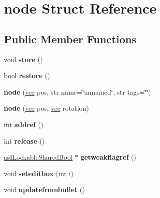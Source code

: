 \hypertarget{structnode}{}\section{node Struct Reference}
\label{structnode}
\subsection*{Public Member Functions}
\begin{DoxyCompactItemize}
\item 
\mbox{\label{structnode_a652e8a3ba9849f68590c6c6ad48727e0}} 
void {\bfseries store} ()
\item 
\mbox{\label{structnode_a4b10bbc34ccf1f2359f9c6bee8688741}} 
bool {\bfseries restore} ()
\item 
\mbox{\label{structnode_ad8786be29caf7d598abd5f0b56306a0d}} 
{\bfseries node} (\hyperlink{structvec}{vec} pos, str name=\char`\"{}unnamed\char`\"{}, str tags=\char`\"{}\char`\"{})
\item 
\mbox{\label{structnode_abfcfb23bb3a6a0e95dff9f06ea8b2eed}} 
{\bfseries node} (\hyperlink{structvec}{vec} pos, \hyperlink{structvec}{vec} rotation)
\item 
\mbox{\label{structnode_a9521b5120834b5f9d2a2471e299691fc}} 
int {\bfseries addref} ()
\item 
\mbox{\label{structnode_afa08d56e84b68071c717d01f93c3c764}} 
int {\bfseries release} ()
\item 
\mbox{\label{structnode_a0987a5e24163efa04953457c1b3ce3d3}} 
\hyperlink{classas_i_lockable_shared_bool}{as\+I\+Lockable\+Shared\+Bool} $\ast$ {\bfseries getweakflagref} ()
\item 
\mbox{\label{structnode_a655d6b57ac3e3a769dfc7f32f970297a}} 
void {\bfseries seteditbox} (int i)
\item 
\mbox{\label{structnode_a3a9d7a8b3a11b537a3bbf5f66c0b7496}} 
void {\bfseries updatefrombullet} ()
\item 
\mbox{\label{structnode_a3615ba4733a1b15dd12f4caab26b4aeb}} 

\end{DoxyCompactItemize}
